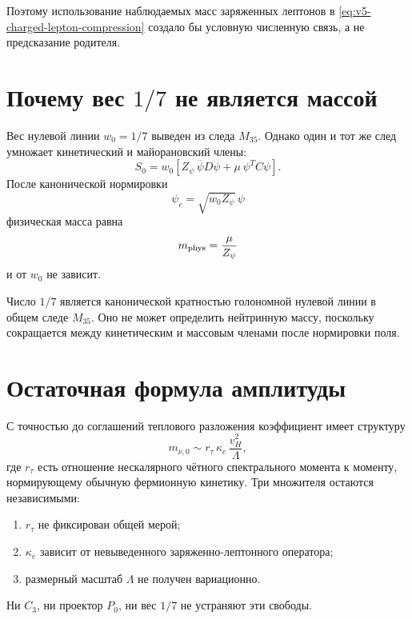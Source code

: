 Поэтому использование наблюдаемых масс заряженных лептонов в
\eqref{eq:v5-charged-lepton-compression} создало бы условную численную
связь, а не предсказание родителя.

\section{Почему вес \texorpdfstring{$1/7$}{1/7} не является массой}

Вес нулевой линии $w_0=1/7$ выведен из следа $M_{35}$. Однако один и тот
же след умножает кинетический и майорановский члены:
\begin{equation}
 S_0=w_0\left[
 Z_\psi\,\overline\psi D\psi
 +\mu\,\psi^TC\psi
 \right].
 \label{eq:v5-common-weight-action}
\end{equation}
После канонической нормировки
\begin{equation}
 \psi_c=\sqrt{w_0Z_\psi}\,\psi
\end{equation}
физическая масса равна
\begin{equation}
 m_{\rm phys}=\frac{\mu}{Z_\psi}
\end{equation}
и от $w_0$ не зависит.

\begin{proposition}
Число $1/7$ является канонической кратностью голономной нулевой линии в
общем следе $M_{35}$. Оно не может определить нейтринную массу, поскольку
сокращается между кинетическим и массовым членами после нормировки поля.
\end{proposition}

\section{Остаточная формула амплитуды}

С точностью до соглашений теплового разложения коэффициент имеет
структуру
\begin{equation}
 m_{\nu,0}\sim
 r_\tau\,\kappa_e\,\frac{v_H^2}{\Lambda},
 \label{eq:v5-weinberg-residual-amplitude}
\end{equation}
где $r_\tau$ есть отношение нескалярного чётного спектрального момента к
моменту, нормирующему обычную фермионную кинетику. Три множителя остаются
независимыми:
\begin{enumerate}
 \item $r_\tau$ не фиксирован общей мерой;
 \item $\kappa_e$ зависит от невыведенного заряженно-лептонного оператора;
 \item размерный масштаб $\Lambda$ не получен вариационно.
\end{enumerate}
Ни $C_3$, ни проектор $P_0$, ни вес $1/7$ не устраняют эти свободы.

